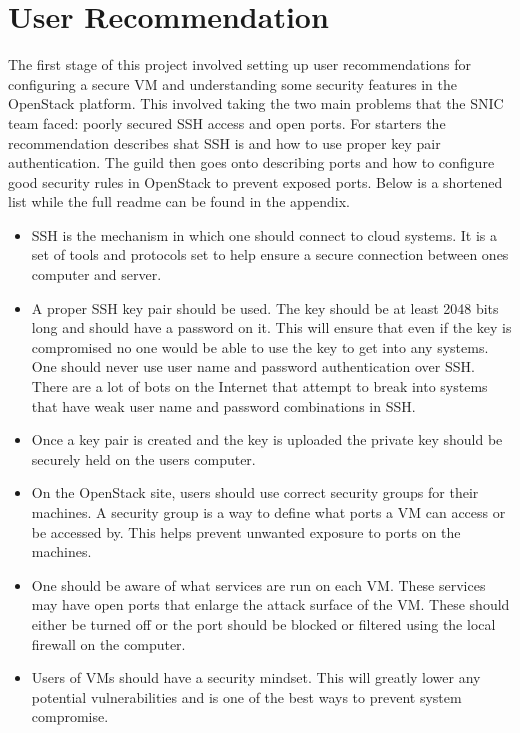 \documentclass[12pt]{article}
\begin{document}
\section{User Recommendation}
The first stage of this project involved setting up user recommendations for configuring a secure VM and understanding some security features in the OpenStack platform. This involved taking the two main problems that the SNIC team faced: poorly secured SSH access and open ports. For starters the recommendation describes shat SSH is and how to use proper key pair authentication. The guild then goes onto describing ports and how to configure good security rules in OpenStack to prevent exposed ports. Below is a shortened list while the full readme can be found in the appendix.

\begin{itemize}
    \item SSH is the mechanism in which one should connect to cloud systems. It is a set of tools and protocols set to help ensure a secure connection between ones computer and server.
    \item A proper SSH key pair should be used. The key should be at least 2048 bits long and should have a password on it. This will ensure that even if the key is compromised no one would be able to use the key to get into any systems. One should never use user name and password authentication over SSH. There are a lot of bots on the Internet that attempt to break into systems that have weak user name and password combinations in SSH.
    \item Once a key pair is created and the key is uploaded the private key should be securely held on the users computer.
    \item On the OpenStack site, users should use correct security groups for their machines. A security group is a way to define what ports a VM can access or be accessed by. This helps prevent unwanted exposure to ports on the machines.
    \item One should be aware of what services are run on each VM. These services may have open ports that enlarge the attack surface of the VM. These should either be turned off or the port should be blocked or filtered using the local firewall on the computer.
    \item Users of VMs should have a security mindset. This will greatly lower any potential vulnerabilities and is one of the best ways to prevent system compromise.

\end{itemize}
\end{document}
